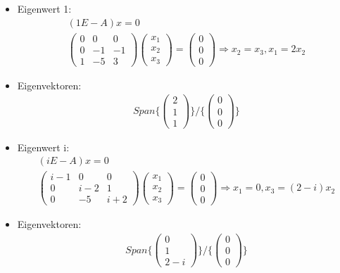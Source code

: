 \begin{itemize}
 \item Eigenwert 1:
\begin{align}
(1 E - A)x = 0 \\
\begin{pmatrix} 0 & 0 & 0 \\ 0 & -1 & -1 \\ 1 & -5 & 3 \end{pmatrix} \begin{pmatrix} x_1 \\ x_2 \\ x_3\end{pmatrix} = \begin{pmatrix} 0 \\ 0 \\ 0 \end{pmatrix} \Rightarrow x_2 = x_3, x_1 = 2x_2 
\end{align}
\item Eigenvektoren:
\begin{align}
Span\{\begin{pmatrix} 2 \\ 1 \\ 1 \end{pmatrix}\} / \{ \begin{pmatrix} 0 \\ 0 \\ 0 \end{pmatrix} \}
\end{align}
\item Eigenwert i:
\begin{align}
(iE-A)x = 0 \\
\begin{pmatrix} i-1 & 0 & 0 \\ 0 & i-2 & 1 \\ 0 & -5 & i+2 \end{pmatrix} \begin{pmatrix} x_1 \\ x_2 \\ x_3\end{pmatrix} = \begin{pmatrix} 0 \\ 0 \\ 0 \end{pmatrix} \Rightarrow x_1 = 0, x_3 = (2-i)x_2  
\end{align}
\item Eigenvektoren:
\begin{align}
Span\{\begin{pmatrix} 0 \\ 1 \\ 2-i \end{pmatrix}\} / \{ \begin{pmatrix} 0 \\ 0 \\ 0 \end{pmatrix} \}

\end{align}
\end{itemize}
